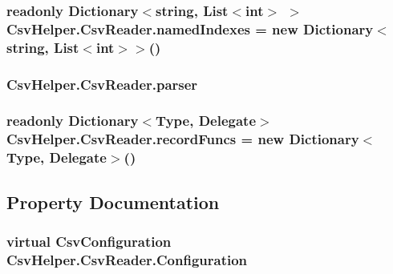 \hypertarget{a00057_a3114f49bd2b3c4966f4b15a310747aeb}{
\subsubsection[{named\-Indexes}]{\setlength{\rightskip}{0pt plus 5cm}readonly Dictionary$<$string, List$<$int$>$ $>$ Csv\-Helper.\-Csv\-Reader.\-named\-Indexes = new Dictionary$<$string, List$<$int$>$$>$()\hspace{0.3cm}{\ttfamily [private]}}}\label{a00057_a3114f49bd2b3c4966f4b15a310747aeb}
\hypertarget{a00057_aaf2ee64c7a157027aea69bfae1fa9edc}{
\subsubsection[{parser}]{ Csv\-Helper.\-Csv\-Reader.\-parser\hspace{0.3cm}{\ttfamily [private]}}}\label{a00057_aaf2ee64c7a157027aea69bfae1fa9edc}
\hypertarget{a00057_af8fa2e4c94750a1d6df3112d5f1d701c}{
\subsubsection[{record\-Funcs}]{\setlength{\rightskip}{0pt plus 5cm}readonly Dictionary$<$Type, Delegate$>$ Csv\-Helper.\-Csv\-Reader.\-record\-Funcs = new Dictionary$<$Type, Delegate$>$()\hspace{0.3cm}{\ttfamily [private]}}}\label{a00057_af8fa2e4c94750a1d6df3112d5f1d701c}


\subsection{Property Documentation}
\hypertarget{a00057_a797f57aadbd5220ccb0cc65e4eef4034}{
\subsubsection[{Configuration}]{\setlength{\rightskip}{0pt plus 5cm}virtual {\bf Csv\-Configuration} Csv\-Helper.\-Csv\-Reader.\-Configuration\hspace{0.3cm}{\ttfamily [get]}}}\label{a00057_a797f57aadbd5220ccb0cc65e4eef4034}


